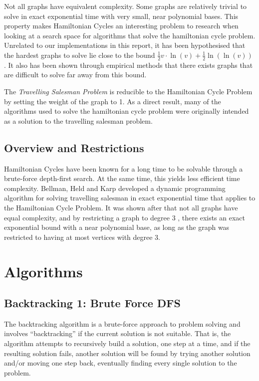 Not all graphs have equivalent complexity. Some graphs are relatively trivial to
solve in exact exponential time with very small, near polynomial bases. This
property makes Hamiltonian Cycles an interesting problem to research when
looking at a search space for algorithms that solve the hamiltonian cycle
problem. Unrelated to our implementations in this report, it has been
hypothesised that the hardest graphs to solve lie close to the bound
$\frac{1}{2} v \cdot \ln(v)+\frac{1}{2} \ln(\ln(v))$ \cite{Szem2006}. It also
has been shown through empirical methods \cite{Berg2021} that there exists
graphs that are difficult to solve far away from this bound. 

The \emph{Travelling Salesman Problem} is reducible to the Hamiltonian Cycle
Problem by setting the weight of the graph to 1. As a direct result, many of the
algorithms used to solve the hamiltonian cycle problem were originally intended
as a solution to the travelling salesman problem.

\subsection{Overview and Restrictions}

Hamiltonian Cycles have been known for a long time to be solvable through a
brute-force depth-first search. At the same time, this yields less efficient
time complexity. Bellman\cite{Bell1962}, Held and Karp\cite{Karp1962} developed
a dynamic programming algorithm for solving travelling salesman in exact
exponential time that applies to the Hamiltonian Cycle Problem. It was shown
after that not all graphs have equal complexity, and by restricting a graph to
degree 3 \cite{Epps2007}, there exists an exact exponential bound with a near
polynomial base, as long as the graph was restricted to having at most vertices
with degree 3.

\newpage

\section{Algorithms}

\subsection{Backtracking 1: Brute Force DFS}

The backtracking algorithm is a brute-force approach to problem solving and
involves “backtracking” if the current solution is not suitable. That is, the
algorithm attempts to recursively build a solution, one step at a time, and if
the resulting solution fails, another solution will be found by trying another
solution and/or moving one step back, eventually finding every single solution
to the problem.

